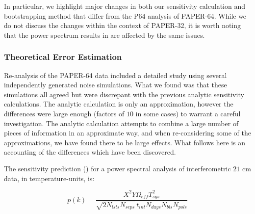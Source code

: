 \documentclass[preprint2,numberedappendix,tighten]{aastex6}  %
\begin{document}
In particular, we highlight major changes in both our sensitivity calculation and bootstrapping method that differ from the P64 analysis of PAPER-64. While we do not discuss the changes within the context of PAPER-32, it is worth noting that the power spectrum results in \citet{parsons_et_al2014} are affected by the same issues.

\subsubsection{Theoretical Error Estimation}
\label{sec:PSSense}

Re-analysis of the PAPER-64 data included a detailed study using several independently generated noise simulations. What we found was that these simulations all agreed but were discrepant with the previous analytic sensitivity calculations. The analytic calculation is only an approximation, however the differences were large enough (factors of $10$ in some cases) to warrant a careful investigation. The analytic calculation attempts to combine a large number of pieces of information in an approximate way, and when re-considering some of the approximations, we have found there to be large effects. What follows here is an accounting of the differences which have been discovered.

The sensitivity prediction (\citealt{parsons_et_al2012a}) for a power spectral analysis of interferometric $21$ cm data, in temperature-units, is:

\begin{equation}
\label{eq:sense}
p(k) = \frac{X^{2}Y \Omega_{eff} T_{sys}^{2}}{\sqrt{2N_{lsts}N_{seps}}\,t_{int}N_{days}N_{bls}N_{pols}}
\end{equation}
\end{document}
